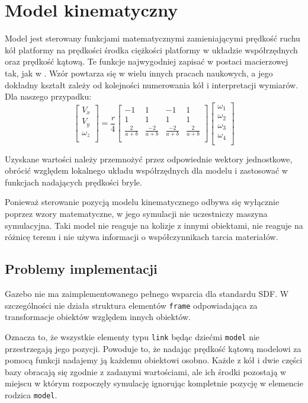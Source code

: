 \section{Model kinematyczny}
Model jest sterowany funkcjami matematycznymi zamieniającymi prędkość ruchu kół platformy na prędkości środka ciężkości platformy w układzie współrzędnych oraz prędkość kątową.
Te funkcje najwygodniej zapisać w postaci macierzowej tak, jak w \cite{wheels}. Wzór powtarza się w wielu innych pracach naukowych, a jego dokładny kształt zależy od kolejności numerowania kół i interpretacji wymiarów.
Dla naszego przypadku:
\[
 \begin{bmatrix}
  V_x \\
  V_y \\
  \omega_z \\
 \end{bmatrix}
 =
 \frac{r}{4}
 \begin{bmatrix}
  -1 & 1 & -1 & 1 \\
  1 & 1 & 1 & 1 \\
  \frac{2}{a+b} & \frac{-2}{a+b} & \frac{-2}{a+b} & \frac{2}{a+b} \\
 \end{bmatrix}
\begin{bmatrix}
 \omega_1 \\
 \omega_2 \\
 \omega_3 \\
 \omega_4 \\
\end{bmatrix}
\]

Uzyskane wartości należy przemnożyć przez odpowiednie wektory jednostkowe, obrócić względem lokalnego układu współrzędnych dla modelu i zastosować w funkcjach nadających prędkości bryle.

Ponieważ sterowanie pozycją modelu kinematycznego odbywa się wyłącznie poprzez wzory matematyczne, w jego symulacji nie uczestniczy maszyna symulacyjna.
Taki model nie reaguje na kolizje z innymi obiektami, nie reaguje na różnicę terenu i nie używa informacji o współczynnikach tarcia materiałów.

\subsection{Problemy implementacji}
Gazebo nie ma zaimplementowanego pełnego wsparcia dla standardu SDF.
W szczególności nie działa struktura elementów \texttt{frame} odpowiadająca za transformacje obiektów względem innych obiektów.

Oznacza to, że wszystkie elementy typu \texttt{link} będąc dziećmi \texttt{model} nie przestrzegają jego pozycji.
Powoduje to, że nadając prędkość kątową modelowi za pomocą funkcji nadajemy ją każdemu obiektowi osobno.
Każde z kół i dwie części bazy obracają się zgodnie z zadanymi wartościami, ale ich środki pozostają w miejscu w którym rozpoczęły symulację ignorując kompletnie pozycję w elemencie rodzica \texttt{model}.

